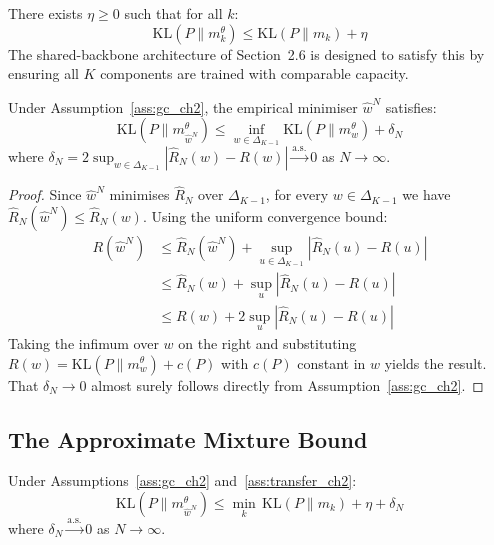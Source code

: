     \begin{assumption}
    \label{ass:transfer_ch2}
    There exists $\eta \geq 0$ such that for all $k$:
    \begin{equation}
        \mathrm{KL}(P \| m^\theta_k) \leq \mathrm{KL}(P \| m_k) + \eta
    \end{equation}
    The shared-backbone architecture of Section~2.6 is designed to satisfy this by ensuring all $K$ components are trained with comparable capacity.
    \end{assumption}

    \begin{lemma}
    \label{lem:excess_risk_ch2}
    Under Assumption~\ref{ass:gc_ch2}, the empirical minimiser $\hat{w}^N$ satisfies:
    \begin{equation}
        \mathrm{KL}(P \| m^\theta_{\hat{w}^N}) \leq \inf_{w \in \Delta_{K-1}} \mathrm{KL}(P \| m^\theta_w) + \delta_N
    \end{equation}
    where $\delta_N = 2\sup_{w \in \Delta_{K-1}} |\hat{R}_N(w) - R(w)| \xrightarrow{\mathrm{a.s.}} 0$ as $N \to \infty$.
    \end{lemma}

    \begin{proof}
    Since $\hat{w}^N$ minimises $\hat{R}_N$ over $\Delta_{K-1}$, for every $w \in \Delta_{K-1}$ we have $\hat{R}_N(\hat{w}^N) \leq \hat{R}_N(w)$. Using the uniform convergence bound:
    \begin{align}
        R(\hat{w}^N) &\leq \hat{R}_N(\hat{w}^N) + \sup_{u \in \Delta_{K-1}} |\hat{R}_N(u) - R(u)| \nonumber \\
        &\leq \hat{R}_N(w) + \sup_{u} |\hat{R}_N(u) - R(u)| \nonumber \\
        &\leq R(w) + 2\sup_{u} |\hat{R}_N(u) - R(u)|
    \end{align}
    Taking the infimum over $w$ on the right and substituting $R(w) = \mathrm{KL}(P \| m^\theta_w) + c(P)$ with $c(P)$ constant in $w$ yields the result. That $\delta_N \to 0$ almost surely follows directly from Assumption~\ref{ass:gc_ch2}.
    \end{proof}

    \subsection{The Approximate Mixture Bound}

    \begin{theorem}
    \label{thm:approx_mixture_ch2}
    Under Assumptions~\ref{ass:gc_ch2} and~\ref{ass:transfer_ch2}:
    \begin{equation}
        \mathrm{KL}(P \| m^\theta_{\hat{w}^N}) \leq \min_k\, \mathrm{KL}(P \| m_k) + \eta + \delta_N
    \end{equation}
    where $\delta_N \xrightarrow{\mathrm{a.s.}} 0$ as $N \to \infty$.
    \end{theorem}

